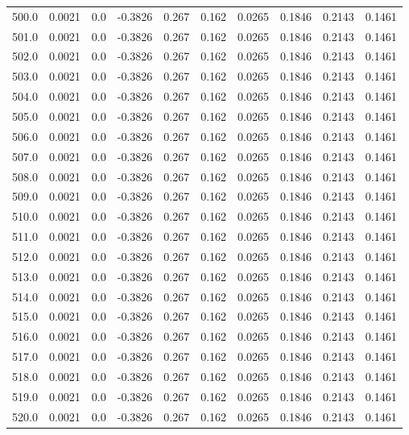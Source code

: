 \begin{longtable}{lrrrrrrrrr}
500.0 & 0.0021 & 0.0 & -0.3826 & 0.267 & 0.162 & 0.0265 & 0.1846 & 0.2143 & 0.1461 \\
501.0 & 0.0021 & 0.0 & -0.3826 & 0.267 & 0.162 & 0.0265 & 0.1846 & 0.2143 & 0.1461 \\
502.0 & 0.0021 & 0.0 & -0.3826 & 0.267 & 0.162 & 0.0265 & 0.1846 & 0.2143 & 0.1461 \\
503.0 & 0.0021 & 0.0 & -0.3826 & 0.267 & 0.162 & 0.0265 & 0.1846 & 0.2143 & 0.1461 \\
504.0 & 0.0021 & 0.0 & -0.3826 & 0.267 & 0.162 & 0.0265 & 0.1846 & 0.2143 & 0.1461 \\
505.0 & 0.0021 & 0.0 & -0.3826 & 0.267 & 0.162 & 0.0265 & 0.1846 & 0.2143 & 0.1461 \\
506.0 & 0.0021 & 0.0 & -0.3826 & 0.267 & 0.162 & 0.0265 & 0.1846 & 0.2143 & 0.1461 \\
507.0 & 0.0021 & 0.0 & -0.3826 & 0.267 & 0.162 & 0.0265 & 0.1846 & 0.2143 & 0.1461 \\
508.0 & 0.0021 & 0.0 & -0.3826 & 0.267 & 0.162 & 0.0265 & 0.1846 & 0.2143 & 0.1461 \\
509.0 & 0.0021 & 0.0 & -0.3826 & 0.267 & 0.162 & 0.0265 & 0.1846 & 0.2143 & 0.1461 \\
510.0 & 0.0021 & 0.0 & -0.3826 & 0.267 & 0.162 & 0.0265 & 0.1846 & 0.2143 & 0.1461 \\
511.0 & 0.0021 & 0.0 & -0.3826 & 0.267 & 0.162 & 0.0265 & 0.1846 & 0.2143 & 0.1461 \\
512.0 & 0.0021 & 0.0 & -0.3826 & 0.267 & 0.162 & 0.0265 & 0.1846 & 0.2143 & 0.1461 \\
513.0 & 0.0021 & 0.0 & -0.3826 & 0.267 & 0.162 & 0.0265 & 0.1846 & 0.2143 & 0.1461 \\
514.0 & 0.0021 & 0.0 & -0.3826 & 0.267 & 0.162 & 0.0265 & 0.1846 & 0.2143 & 0.1461 \\
515.0 & 0.0021 & 0.0 & -0.3826 & 0.267 & 0.162 & 0.0265 & 0.1846 & 0.2143 & 0.1461 \\
516.0 & 0.0021 & 0.0 & -0.3826 & 0.267 & 0.162 & 0.0265 & 0.1846 & 0.2143 & 0.1461 \\
517.0 & 0.0021 & 0.0 & -0.3826 & 0.267 & 0.162 & 0.0265 & 0.1846 & 0.2143 & 0.1461 \\
518.0 & 0.0021 & 0.0 & -0.3826 & 0.267 & 0.162 & 0.0265 & 0.1846 & 0.2143 & 0.1461 \\
519.0 & 0.0021 & 0.0 & -0.3826 & 0.267 & 0.162 & 0.0265 & 0.1846 & 0.2143 & 0.1461 \\
520.0 & 0.0021 & 0.0 & -0.3826 & 0.267 & 0.162 & 0.0265 & 0.1846 & 0.2143 & 0.1461 \\

\end{longtable}
